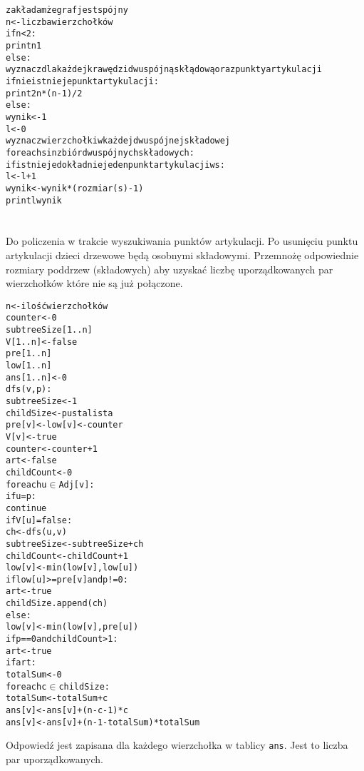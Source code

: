 \documentclass[a4paper,12pt]{article}
\begin{document}
\begin{alltt}
 zakładam że graf jest spójny
 n <- liczba wierzchołków
 if n < 2:
    print n 1
 else:
    wyznacz dla każdej krawędzi dwuspójną skłądową oraz punkty artykulacji
    if nie istnieje punkt artykulacji:
        print 2 n*(n-1)/2
    else:
        wynik <- 1
        l <- 0
        wyznacz wierzchołki w każdej dwuspójnej składowej
        for each s in zbiór dwuspójnych składowych:
            if istnieje dokładnie jeden punkt artykulacji w s:
                l <- l + 1
                wynik <- wynik * (rozmiar(s) - 1)
        print l wynik
\end{alltt}


\section{}
Do policzenia w trakcie wyszukiwania punktów artykulacji. Po usunięciu punktu artykulacji dzieci drzewowe będą osobnymi składowymi. Przemnożę odpowiednie rozmiary poddrzew (składowych) aby uzyskać liczbę uporządkowanych par wierzchołków które nie są już połączone.

\begin{alltt}
n <- ilość wierzchołków
counter <- 0
subtreeSize[1..n]
V[1..n] <- false
pre[1..n]
low[1..n]
ans[1..n] <- 0
 dfs(v,p):
    subtreeSize <- 1
    childSize <- pusta lista
    pre[v] <- low[v] <- counter
    V[v] <- true
    counter <- counter + 1
    art <- false
    childCount <- 0
    for each u \(\in\) Adj[v]:
        if u = p:
            continue
        if V[u] = false:
            ch <- dfs(u,v)
            subtreeSize <- subtreeSize + ch
            childCount <- childCount + 1
            low[v] <- min(low[v],low[u])
            if low[u]>=pre[v] and p != 0:
                art <- true
                childSize.append(ch)
        else:
            low[v] <- min(low[v],pre[u])
    if p==0 and childCount>1:
        art <- true
    if art:
        totalSum <- 0
        for each c \(\in\) childSize:
            totalSum <- totalSum + c
            ans[v] <- ans[v] + (n-c-1)*c
        ans[v] <- ans[v] + (n-1-totalSum)*totalSum
            
\end{alltt}
Odpowiedź jest zapisana dla każdego wierzchołka w tablicy \verb|ans|. Jest to liczba par uporządkowanych.
\end{document}
